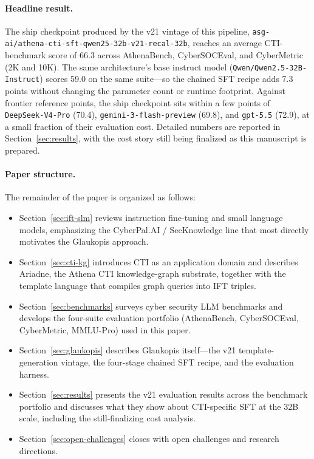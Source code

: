\documentclass[unnumsec,webpdf,contemporary,large]{oup-authoring-template}
\theoremstyle{thmstyleone}
\theoremstyle{thmstyletwo}
\theoremstyle{thmstylethree}
\begin{document}
\paragraph{Headline result.}
The ship checkpoint produced by the v21 vintage of this pipeline, \texttt{asg-ai/athena-cti-sft-qwen25-32b-v21-recal-32b}, reaches an average CTI-benchmark score of 66.3 across AthenaBench, CyberSOCEval, and CyberMetric (2K and 10K). The same architecture's base instruct model (\texttt{Qwen/Qwen2.5-32B-Instruct}) scores 59.0 on the same suite---so the chained SFT recipe adds 7.3 points without changing the parameter count or runtime footprint. Against frontier reference points, the ship checkpoint sits within a few points of \texttt{DeepSeek-V4-Pro} (70.4), \texttt{gemini-3-flash-preview} (69.8), and \texttt{gpt-5.5} (72.9), at a small fraction of their evaluation cost. Detailed numbers are reported in Section~\ref{sec:results}, with the cost story still being finalized as this manuscript is prepared.

\paragraph{Paper structure.}
The remainder of the paper is organized as follows:
\begin{itemize}
  \item Section~\ref{sec:ift-slm} reviews instruction fine-tuning and small language models, emphasizing the CyberPal.AI / SecKnowledge line that most directly motivates the Glaukopis approach.
  \item Section~\ref{sec:cti-kg} introduces CTI as an application domain and describes Ariadne, the Athena CTI knowledge-graph substrate, together with the template language that compiles graph queries into IFT triples.
  \item Section~\ref{sec:benchmarks} surveys cyber security LLM benchmarks and develops the four-suite evaluation portfolio (AthenaBench, CyberSOCEval, CyberMetric, MMLU-Pro) used in this paper.
  \item Section~\ref{sec:glaukopis} describes Glaukopis itself---the v21 template-generation vintage, the four-stage chained SFT recipe, and the evaluation harness.
  \item Section~\ref{sec:results} presents the v21 evaluation results across the benchmark portfolio and discusses what they show about CTI-specific SFT at the 32B scale, including the still-finalizing cost analysis.
  \item Section~\ref{sec:open-challenges} closes with open challenges and research directions.
\end{itemize}
\end{document}
